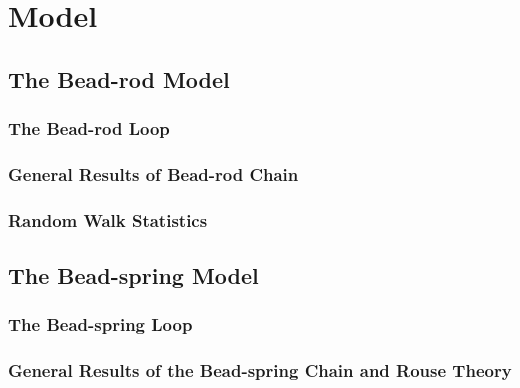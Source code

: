 
\chapter{Model}

\ifpdf
    \graphicspath{{Chapter2/Figs/Raster/}{Chapter2/Figs/PDF/}{Chapter2/Figs/}}
\else
    \graphicspath{{Chapter2/Figs/Vector/}{Chapter2/Figs/}}
\fi

\section{The Bead-rod Model}
\label{sec:the_bead_rod_model}

\subsection{The Bead-rod Loop}
\label{sub:the_bead_rod_loop}

\subsection{General Results of Bead-rod Chain}
\label{sub:general_results_of_bead_rod_chain}

\subsection{Random Walk Statistics}
\label{sub:random_walk_statistics}





\section{The Bead-spring Model}
\label{sec:the_bead_spring_model}

\subsection{The Bead-spring Loop}
\label{sub:the_bead_spring_loop}

\subsection{General Results of the Bead-spring Chain and Rouse Theory}
\label{sub:general_results_of_the_bead_spring_chain_and_rouse_theory}



